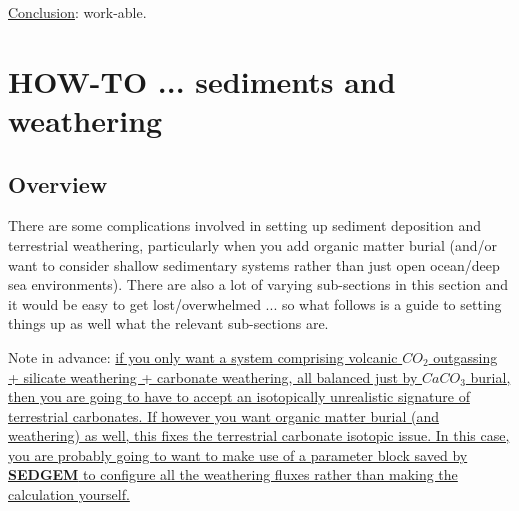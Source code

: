 \begin{enumerate}
\uline{Conclusion}: work-able.

\end{enumerate}

\newpage

\section{HOW-TO ... sediments and weathering}

\subsection*{Overview}
\vspace{1mm}

There are some complications involved in setting up sediment deposition and terrestrial weathering, particularly when you add organic matter burial (and/or want to consider shallow sedimentary systems rather than just open ocean/deep sea environments). There are also a lot of varying sub-sections in this section and it would be easy to get lost/overwhelmed ... so what follows is a guide to setting things up as well what the relevant sub-sections are.

\vspace{1mm}
\noindent Note in advance: \uline{if you only want a system comprising volcanic \(CO_{2}\) outgassing + silicate weathering + carbonate weathering, all balanced just by \(CaCO_{3}\) burial, then you are going to have to accept an isotopically unrealistic  signature of terrestrial carbonates. If however you want organic matter burial (and weathering) as well, this fixes the terrestrial carbonate isotopic issue. In this case, you are probably going to want to make use of a parameter block saved by \textbf{SEDGEM} to configure all the weathering fluxes rather than making the calculation yourself.}

